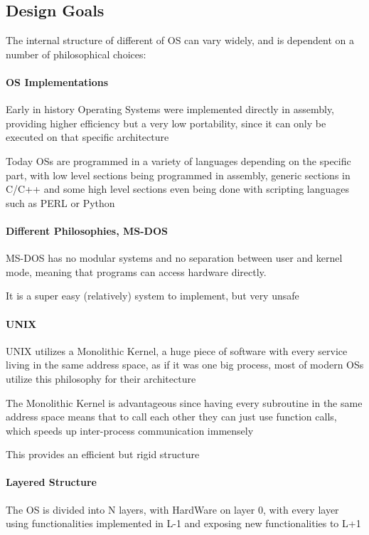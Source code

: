 \documentclass[openright, twoside]{report}
\theoremstyle{definition}
\theoremstyle{example}
\begin{document}
				\subsection{Design Goals}
					The internal structure of different of OS can vary widely, and is 
					dependent on a number of philosophical choices:

					\paragraph{OS Implementations} Early in history Operating Systems were
					implemented directly in assembly, providing higher efficiency
					but a very low portability, since it can only be executed on that 
					specific architecture 

					Today OSs are programmed in a variety of languages depending on the 
					specific part, with low level sections being programmed in assembly, 
					generic sections in C/C++
					and some high level sections even being done with scripting languages 
					such as PERL or Python 

					\paragraph{Different Philosophies, MS-DOS} MS-DOS has no modular 
					systems and no separation between user and kernel mode, meaning that 
					programs can access hardware directly.

					It is a super easy (relatively) system to implement, but very unsafe

					\paragraph{UNIX} UNIX utilizes a Monolithic Kernel, a huge piece of 
					software with every service living in the same address space, as if it 
					was one big process, most of modern OSs utilize this
					philosophy for their architecture

					The Monolithic Kernel is advantageous since having every subroutine 
					in the same address space means that to call each other they can just 
					use function calls, which speeds up
					inter-process communication immensely

					This provides an efficient but rigid structure 

					\paragraph{Layered Structure}
					\label{par:OS_layer}
					 The OS is divided into N layers, with HardWare on layer 0, 
					 with every layer using functionalities implemented in L-1 
					and exposing new functionalities to L+1
\end{document}
